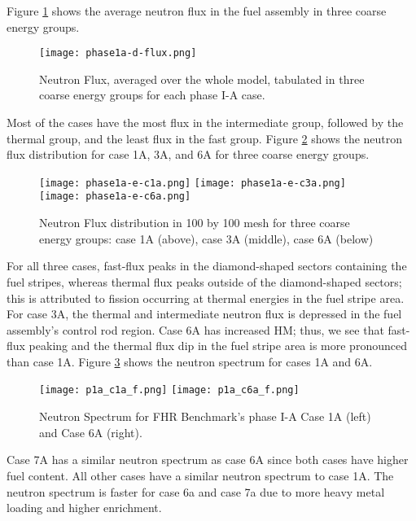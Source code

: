 Figure \ref{fig:phase1a-d} shows the average neutron flux in the fuel assembly in 
three coarse energy groups. 
\begin{figure}[]
    \centering
    \texttt{[image: phase1a-d-flux.png]} 
    \caption{Neutron Flux, averaged over the whole model, tabulated in three coarse 
    energy groups for each phase I-A case. }
    \label{fig:phase1a-d}
\end{figure}
Most of the cases have the most flux in the intermediate group, followed by 
the thermal group, and the least flux in the fast group.    
Figure \ref{fig:phase1a-e} shows the neutron flux distribution for case 1A, 
3A, and 6A for three coarse energy groups. 
\begin{figure}[]
    \centering
    \texttt{[image: phase1a-e-c1a.png]} 
    \texttt{[image: phase1a-e-c3a.png]} 
    \texttt{[image: phase1a-e-c6a.png]} 
    \caption{Neutron Flux distribution in 100 by 100 mesh for three coarse 
    energy groups: case 1A (above), case 3A (middle), case 6A (below) }
    \label{fig:phase1a-e}
\end{figure}
For all three cases, fast-flux peaks in the diamond-shaped sectors containing 
the fuel stripes, whereas thermal flux peaks outside of the diamond-shaped 
sectors; this is attributed to fission occurring at thermal energies in the 
fuel stripe area. 
For case 3A, the thermal and intermediate neutron flux is depressed in the fuel 
assembly's control rod region.  
Case 6A has increased \gls{HM}; thus, we see that fast-flux peaking and the 
thermal flux dip in the fuel stripe area is more pronounced than case 1A.
Figure \ref{fig:phase1a-f} shows the neutron spectrum for cases 1A and 6A. 
\begin{figure}[]
    \centering
    \texttt{[image: p1a\_c1a\_f.png]} 
    \texttt{[image: p1a\_c6a\_f.png]} 
    \caption{Neutron Spectrum for \gls{FHR} Benchmark's phase I-A Case 1A 
    (left) and Case 6A (right).}
    \label{fig:phase1a-f}
\end{figure}
Case 7A has a similar neutron spectrum as case 6A since both cases have 
higher fuel content. 
All other cases have a similar neutron spectrum to case 1A.
The neutron spectrum is faster for case 6a and case 7a due to more heavy metal 
loading and higher enrichment.  

